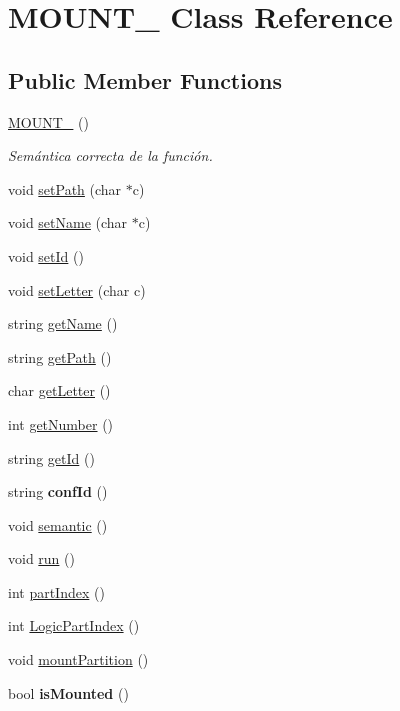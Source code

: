 \hypertarget{classMOUNT__}{}\section{M\+O\+U\+N\+T\+\_\+ Class Reference}
\label{classMOUNT__}
\subsection*{Public Member Functions}
\begin{DoxyCompactItemize}
\item 
\hyperlink{classMOUNT___ab2412abd1fe27e4c58bad1ec543c1bfd}{M\+O\+U\+N\+T\+\_\+} ()
\begin{DoxyCompactList}\small\item\em Semántica correcta de la función. \end{DoxyCompactList}\item 
void \hyperlink{classMOUNT___a6d628a264a4f7652fb79db60a8f74d5c}{set\+Path} (char $\ast$c)
\item 
void \hyperlink{classMOUNT___a07920ca266d5f28996f14ac76d5cfbd4}{set\+Name} (char $\ast$c)
\item 
void \hyperlink{classMOUNT___a938fb0ea2d4dacaf795ceed3dba82552}{set\+Id} ()
\item 
void \hyperlink{classMOUNT___a0c2649414eda3ba4132e847e9903830c}{set\+Letter} (char c)
\item 
string \hyperlink{classMOUNT___aa22dd1507def0dd79278528eb364ff2e}{get\+Name} ()
\item 
string \hyperlink{classMOUNT___a3fa81be2f40ddf3f043c8f459cbaa3e6}{get\+Path} ()
\item 
char \hyperlink{classMOUNT___ac5af7651aa4eeede67b21c1c728bf898}{get\+Letter} ()
\item 
int \hyperlink{classMOUNT___a737ec85f4dd23d389d85b9dee48d18ce}{get\+Number} ()
\item 
string \hyperlink{classMOUNT___ae42ec4c474c9fd74a25869cf13f9436a}{get\+Id} ()
\item 
\mbox{\label{classMOUNT___adef287e870112d76ef9e03e79c95c518}} 
string {\bfseries conf\+Id} ()
\item 
void \hyperlink{classMOUNT___ae0df247d4a3d27886c941352607d7bc2}{semantic} ()
\item 
void \hyperlink{classMOUNT___a4ed2206e1edd2eec7804514ebdbb8ee3}{run} ()
\item 
int \hyperlink{classMOUNT___a3ff41f627cb6e3e573da1b627850e01a}{part\+Index} ()
\item 
int \hyperlink{classMOUNT___a709e81cf0e777d2dfa9c24ca30a3c778}{Logic\+Part\+Index} ()
\item 
void \hyperlink{classMOUNT___a58750b67c92586b45a944d5eeb2f7645}{mount\+Partition} ()
\item 
\mbox{\label{classMOUNT___adb6c42535a48b023d8e5f5afed030781}} 
bool {\bfseries is\+Mounted} ()
\end{DoxyCompactItemize}


